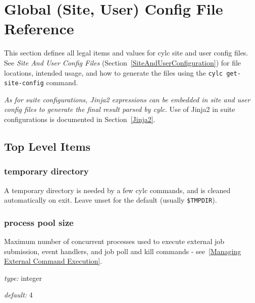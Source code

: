 \section{Global (Site, User) Config File Reference}
\label{SiteRCReference}

\lstset{language=transcript}

This section defines all legal items and values for cylc site and
user config files. See {\em Site And User Config Files}
(Section~\ref{SiteAndUserConfiguration}) for file locations, intended
usage, and how to generate the files using the
\lstinline=cylc get-site-config= command.

{\em As for suite configurations, Jinja2 expressions can be embedded in
site and user config files to generate the final result parsed by cylc.}
Use of Jinja2 in suite configurations is documented in
Section~\ref{Jinja2}.

\subsection{Top Level Items}

\subsubsection{temporary directory}

A temporary directory is needed by a few cylc commands, and is cleaned
automatically on exit. Leave unset for the default (usually
\lstinline=$TMPDIR=).


\subsubsection{process pool size}
\label{process pool size}

Maximum number of concurrent processes used to execute external job submission,
event handlers, and job poll and kill commands - see~\ref{Managing External
Command Execution}.

\begin{myitemize}
\item {\em type:} integer
\item {\em default:} 4
\end{myitemize}

